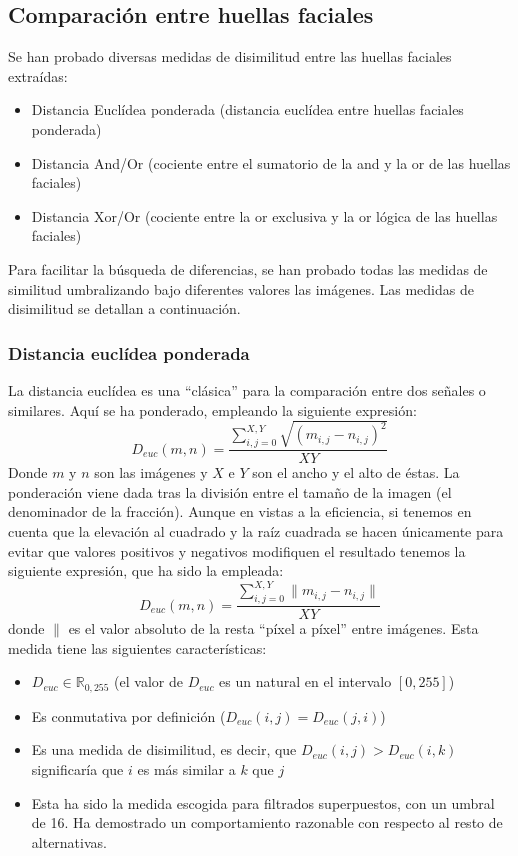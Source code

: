 \subsection{Comparación entre huellas faciales}

Se han probado diversas medidas de disimilitud entre las huellas faciales extraídas:
\begin{itemize}
	\item{Distancia Euclídea ponderada (distancia euclídea entre huellas faciales ponderada)}
	\item{Distancia And/Or (cociente entre el sumatorio de la and y la or de las huellas faciales)}
	\item{Distancia Xor/Or (cociente entre la or exclusiva y la or lógica de las huellas faciales)}
\end{itemize}
Para facilitar la búsqueda de diferencias, se han probado todas las medidas de similitud umbralizando bajo diferentes valores las imágenes.
Las medidas de disimilitud se detallan a continuación.
\subsubsection{Distancia euclídea ponderada}
La distancia euclídea es una ``clásica'' para la comparación entre dos señales o similares. Aquí se ha ponderado, empleando la siguiente expresión:
\[
D_{euc}(m,n)=\frac{\sum_{i,j=0}^{X,Y}{\sqrt{(m_{i,j}-n_{i,j})^2}}}{XY}
\]
Donde $m$ y $n$ son las imágenes y $X$ e $Y$ son el ancho y el alto de éstas. La ponderación viene dada tras la división entre el tamaño de la imagen (el denominador de la fracción). Aunque en vistas a la eficiencia, si tenemos en cuenta que la elevación al cuadrado y la raíz cuadrada se hacen únicamente para evitar que valores positivos y negativos modifiquen el resultado tenemos la siguiente expresión, que ha sido la empleada:
\[
D_{euc}(m,n)=\frac{\sum_{i,j=0}^{X,Y}{\parallel m_{i,j}-n_{i,j}\parallel}}{XY}
\]
donde $\parallel$ es el valor absoluto de la resta ``píxel a píxel'' entre imágenes. Esta medida tiene las siguientes características:
\begin{itemize}
	\item{$D_{euc}\in\mathbb{R}_{0,255}$ (el valor de $D_{euc}$ es un natural en el intervalo $\left[0,255\right]$)} 
	\item{Es conmutativa por definición ($D_{euc}(i,j)=D_{euc}(j,i)$)}
	\item{Es una medida de disimilitud, es decir, que $D_{euc}(i,j) > D_{euc} (i,k)$ significaría que $i$ es más similar a $k$ que $j$}
	\item{Esta ha sido la medida escogida para filtrados superpuestos, con un umbral de 16. Ha demostrado un comportamiento razonable con respecto al resto de alternativas.}
\end{itemize}

